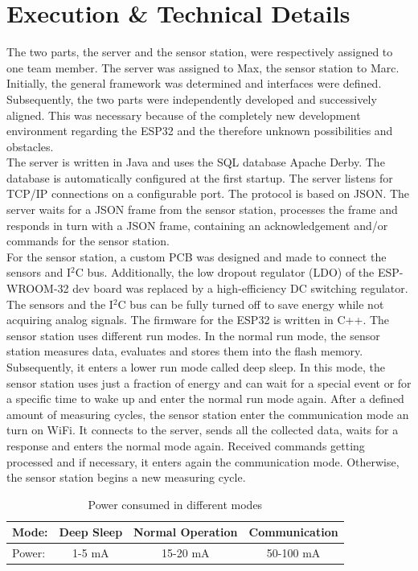 \section{Execution \& Technical Details}
The two parts, the server and the sensor station, were respectively assigned to one team member. The server was assigned to Max, the sensor station to Marc. Initially, the general framework was determined and interfaces were defined. Subsequently, the two parts were independently developed and successively aligned. This was necessary because of the completely new development environment regarding the ESP32 and the therefore unknown possibilities and obstacles.\\

The server is written in Java and uses the SQL database Apache Derby. The database is automatically configured at the first startup. The server listens for TCP/IP connections on a configurable port. The protocol is based on JSON. The server waits for a JSON frame from the sensor station, processes the frame and responds in turn with a JSON frame, containing an acknowledgement and/or commands for the sensor station.\\

For the sensor station, a custom PCB was designed and made to connect the sensors and I${}^{2}$C bus. Additionally, the low dropout regulator (LDO) of the ESP-WROOM-32 dev board was replaced by a high-efficiency DC switching regulator. The sensors and the I${}^{2}$C bus can be fully turned off to save energy while not acquiring analog signals. The firmware for the ESP32 is written in C++.
The sensor station uses different run modes. In the normal run mode, the sensor station measures data, evaluates and stores them into the flash memory. Subsequently, it enters a lower run mode called deep sleep. In this mode, the sensor station uses just a fraction of energy and can wait for a special event or for a specific time to wake up and enter the normal run mode again. After a defined amount of measuring cycles, the sensor station enter the communication mode an turn on WiFi. It connects to the server, sends all the collected data, waits for a response and enters the normal mode again. Received commands getting processed and if necessary, it enters again the communication mode. Otherwise, the sensor station begins a new measuring cycle.
\begin{table}[htbp]
	\begin{center}
		\begin{tabular}{|l|c|c|c|}
			\hline 
			Mode: & Deep Sleep & Normal Operation & Communication \\ 
			\hline 
			Power: & 1-5 mA & 15-20 mA & 50-100 mA \\ 
			\hline 
		\end{tabular} 
	\end{center}
	\caption{Power consumed in different modes}
\end{table}\\

